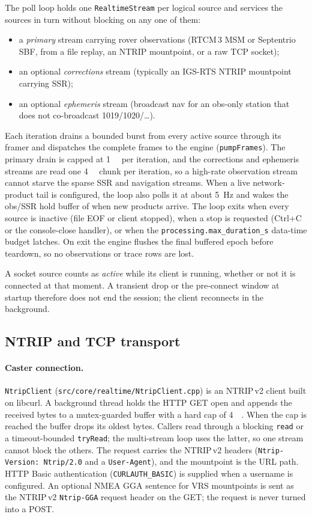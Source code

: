 \documentclass[main.tex]{subfiles}
\begin{document}
The poll loop holds one \texttt{RealtimeStream} per logical source and
services the sources in turn without blocking on any one of them:
\begin{itemize}[leftmargin=*, itemsep=0pt]
\item a \emph{primary} stream carrying rover observations (RTCM\,3 MSM
      or Septentrio SBF, from a file replay, an NTRIP mountpoint, or a
      raw TCP socket);
\item an optional \emph{corrections} stream (typically an IGS-RTS NTRIP
      mountpoint carrying SSR);
\item an optional \emph{ephemeris} stream (broadcast nav for an
      obs-only station that does not co-broadcast 1019/1020/\ldots).
\end{itemize}
Each iteration drains a bounded burst from every active source through
its framer and dispatches the complete frames to the engine
(\texttt{pumpFrames}).  The primary drain is capped at
\SI{1}{\mebi\byte} per iteration, and the corrections and ephemeris
streams are read one \SI{4}{\kibi\byte} chunk per iteration, so a
high-rate observation stream cannot starve the sparse SSR and navigation
streams.  When a live network-product tail is configured, the loop also
polls it at about \SI{5}{\hertz} and wakes the obs/SSR hold buffer of
 when new products arrive.  The loop exits when every
source is inactive (file EOF or client stopped), when a stop is
requested (Ctrl+C or the console-close handler), or when the
\texttt{processing.max\_duration\_s} data-time budget latches.  On exit
the engine flushes the final buffered epoch before teardown, so no
observations or trace rows are lost.

A socket source counts as \emph{active} while its client is running,
whether or not it is connected at that moment.  A transient drop or the
pre-connect window at startup therefore does not end the session; the
client reconnects in the background.

\subsection{NTRIP and TCP transport}\label{sec:rt-ntrip}

\paragraph{Caster connection.}
\texttt{NtripClient} (\texttt{src/core/realtime/NtripClient.cpp}) is an
NTRIP\,v2 client built on libcurl.  A background thread holds the HTTP
GET open and appends the received bytes to a mutex-guarded buffer with a
hard cap of \SI{4}{\mebi\byte}.  When the cap is reached the buffer
drops its oldest bytes.  Callers read through a blocking
\texttt{read} or a timeout-bounded \texttt{tryRead}; the multi-stream
loop uses the latter, so one stream cannot block the others.  The
request carries the NTRIP\,v2 headers (\texttt{Ntrip-Version:
Ntrip/2.0} and a \texttt{User-Agent}), and the mountpoint is the URL
path.  HTTP Basic authentication (\texttt{CURLAUTH\_BASIC}) is supplied
when a username is configured.  An optional NMEA GGA sentence for VRS
mountpoints is sent as the NTRIP\,v2 \texttt{Ntrip-GGA} request header on
the GET; the request is never turned into a POST.
\end{document}

